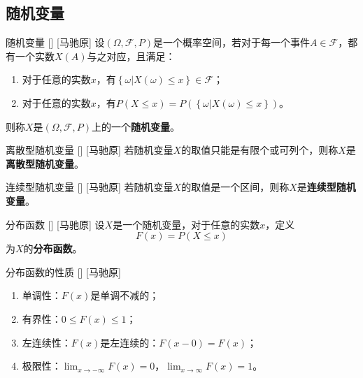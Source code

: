 \documentclass[UTF8]{ctexart}
\begin{document}
    \subsection{随机变量}

        \begin{dfn}
            []
            {随机变量}
            []
            [马驰原]
            设$(\Omega,\mathcal{F},P)$是一个概率空间，若对于每一个事件$A\in\mathcal{F}$，都有一个实数$X(A)$与之对应，且满足：

            \begin{enumerate}
                \item 对于任意的实数$x$，有$\left\{\omega|X(\omega)\leq x\right\}\in\mathcal{F}$；
                \item 对于任意的实数$x$，有$P\left(X\leq x\right)=P\left(\left\{\omega|X(\omega)\leq x\right\}\right)$。
            \end{enumerate}

            则称$X$是$(\Omega,\mathcal{F},P)$上的一个\textbf{随机变量}。
        \end{dfn}

        \begin{dfn}
            []
            {离散型随机变量}
            []
            [马驰原]
            若随机变量$X$的取值只能是有限个或可列个，则称$X$是\textbf{离散型随机变量}。
        \end{dfn}

        \begin{dfn}
            []
            {连续型随机变量}
            []
            [马驰原]
            若随机变量$X$的取值是一个区间，则称$X$是\textbf{连续型随机变量}。
        \end{dfn}

        \begin{dfn}
            []
            {分布函数}
            []
            [马驰原]
            设$X$是一个随机变量，对于任意的实数$x$，定义\[F(x)=P(X\leq x)\]为$X$的\textbf{分布函数}。
        \end{dfn}

        \begin{ppt}
            []
            {分布函数的性质}
            []
            [马驰原]
            \begin{enumerate}
                \item 单调性：$F(x)$是单调不减的；
                \item 有界性：$0\leq F(x)\leq 1$；
                \item 左连续性：$F(x)$是左连续的：$F(x-0)=F(x)$；
                \item 极限性：$\lim_{x\to-\infty}F(x)=0$，$\lim_{x\to\infty}F(x)=1$。
            \end{enumerate}
        \end{ppt}
\end{document}
